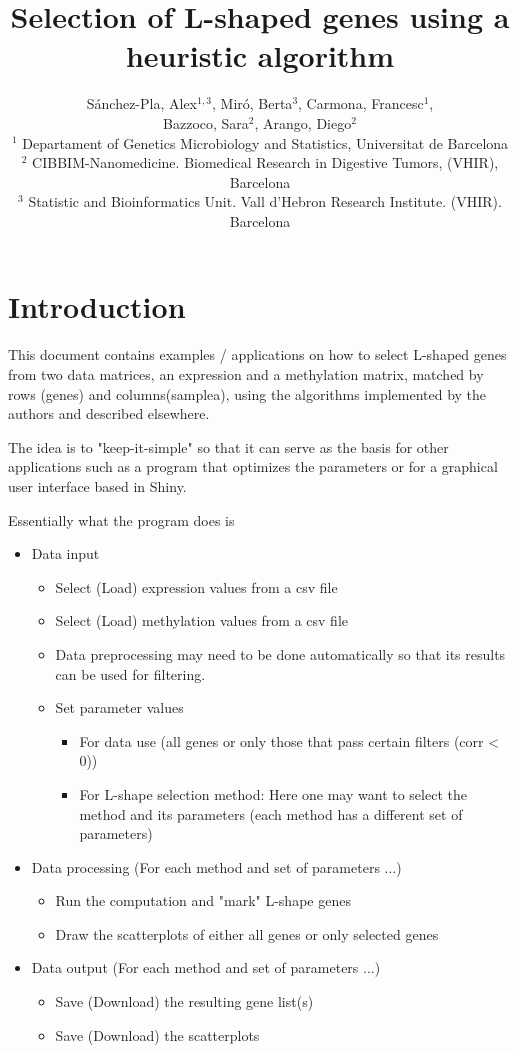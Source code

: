 \documentclass[a4paper,10pt]{article}\usepackage[]{graphicx}\usepackage[]{color}
\title{Selection of L-shaped genes using a heuristic algorithm}
\author{S\'anchez-Pla, Alex$^{1,3}$, Mir\'o, Berta$^3$, Carmona, Francesc$^1$, \\ Bazzoco, Sara$^2$, Arango, Diego$^2$\\
  $^1$ Departament of Genetics Microbiology and Statistics, Universitat de Barcelona\\
  $^2$ CIBBIM-Nanomedicine. Biomedical Research in Digestive Tumors, (VHIR), Barcelona\\
  $^3$ Statistic and Bioinformatics Unit. Vall d'Hebron Research Institute.  (VHIR). Barcelona}
\date{}
\begin{document}



\maketitle

\thispagestyle{empty}

\tableofcontents

\section{Introduction}

This document contains examples / applications on how to select L-shaped genes from two data matrices, an expression and a methylation matrix, matched by rows (genes) and columns(samplea), using the algorithms implemented by the authors and described elsewhere.
 

The idea is to "keep-it-simple" so that it can serve as the basis for other applications such as a program that optimizes the parameters or for a graphical user interface based in Shiny.

Essentially what the program does is
\begin{itemize}
  \item Data input
  \begin{itemize} 
    \item Select (Load) expression values from a csv file
    \item Select (Load) methylation values from a csv file
    \item Data preprocessing may need to be done automatically so that its results can be used for filtering.
    \item Set parameter values
    \begin{itemize}
      \item For data use (all genes or only those that pass certain filters (corr < 0))
      \item For L-shape selection method: Here one may want to select the method and its parameters (each method has a different set of parameters)
    \end{itemize}
  \end{itemize}
  \item Data processing (For each method and set of parameters ...)
  \begin{itemize} 
    \item Run the computation and "mark" L-shape genes
    \item Draw the scatterplots of either all genes or only selected genes
  \end{itemize}
  \item Data output (For each method and set of parameters ...)
  \begin{itemize} 
    \item Save (Download) the resulting gene list(s)
    \item Save (Download) the scatterplots 
  \end{itemize}
\end{itemize}
\end{document}
